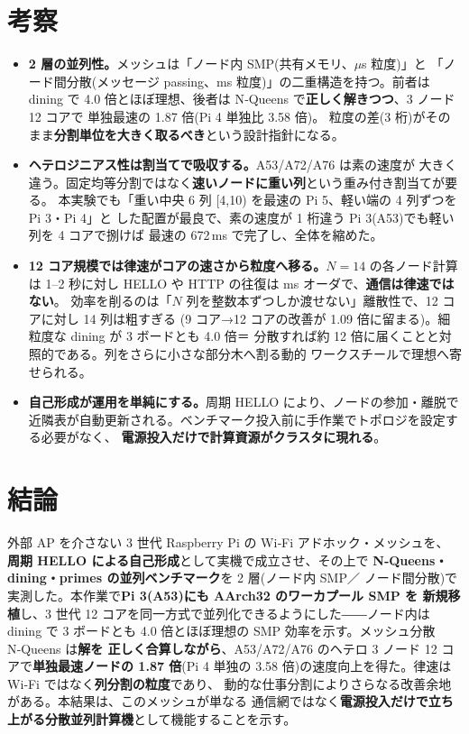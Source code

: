 \documentclass[11pt,a4paper]{article}
\begin{document}
\section{考察}
\begin{itemize}[leftmargin=1.4em,itemsep=3pt]
\item \textbf{2 層の並列性。}メッシュは「ノード内 SMP(共有メモリ、$\mu$s 粒度)」と
  「ノード間分散(メッセージ passing、ms 粒度)」の二重構造を持つ。前者は dining で
  4.0 倍とほぼ理想、後者は N‑Queens で\textbf{正しく解きつつ}、3 ノード 12 コアで
  単独最速の 1.87 倍(Pi 4 単独比 3.58 倍)。
  粒度の差(3 桁)がそのまま\textbf{分割単位を大きく取るべき}という設計指針になる。
\item \textbf{ヘテロジニアス性は割当てで吸収する。}A53/A72/A76 は素の速度が
  大きく違う。固定均等分割ではなく\textbf{速いノードに重い列}という重み付き割当てが要る。
  本実験でも「重い中央 6 列 [4,10) を最速の Pi 5、軽い端の 4 列ずつを Pi 3・Pi 4」と
  した配置が最良で、素の速度が 1 桁違う Pi 3(A53)でも軽い列を 4 コアで捌けば
  最速の 672\,ms で完了し、全体を縮めた。
\item \textbf{12 コア規模では律速がコアの速さから粒度へ移る。}$N{=}14$ の各ノード計算は
  1--2 秒に対し HELLO や HTTP の往復は ms オーダで、\textbf{通信は律速ではない}。
  効率を削るのは「$N$ 列を整数本ずつしか渡せない」離散性で、12 コアに対し 14 列は粗すぎる
  (9 コア→12 コアの改善が 1.09 倍に留まる)。細粒度な dining が 3 ボードとも 4.0 倍＝
  分散すれば約 12 倍に届くことと対照的である。列をさらに小さな部分木へ割る動的
  ワークスチールで理想へ寄せられる。
\item \textbf{自己形成が運用を単純にする。}周期 HELLO により、ノードの参加・離脱で
  近隣表が自動更新される。ベンチマーク投入前に手作業でトポロジを設定する必要がなく、
  \textbf{電源投入だけで計算資源がクラスタに現れる}。
\end{itemize}

\section{結論}
外部 AP を介さない 3 世代 Raspberry Pi の Wi‑Fi アドホック・メッシュを、
\textbf{周期 HELLO による自己形成}として実機で成立させ、その上で
\textbf{N‑Queens・dining・primes の並列ベンチマーク}を 2 層(ノード内 SMP／
ノード間分散)で実測した。本作業で\textbf{Pi 3(A53)にも AArch32 のワーカプール SMP を
新規移植}し、3 世代 12 コアを同一方式で並列化できるようにした――ノード内は dining で
3 ボードとも 4.0 倍とほぼ理想の SMP 効率を示す。メッシュ分散 N‑Queens は\textbf{解を
正しく合算しながら}、A53/A72/A76 のヘテロ 3 ノード 12 コアで\textbf{単独最速ノードの
1.87 倍}(Pi 4 単独の 3.58 倍)の速度向上を得た。律速は Wi‑Fi ではなく\textbf{列分割の粒度}であり、
動的な仕事分割によりさらなる改善余地がある。本結果は、このメッシュが単なる
通信網ではなく\textbf{電源投入だけで立ち上がる分散並列計算機}として機能することを示す。
\end{document}
